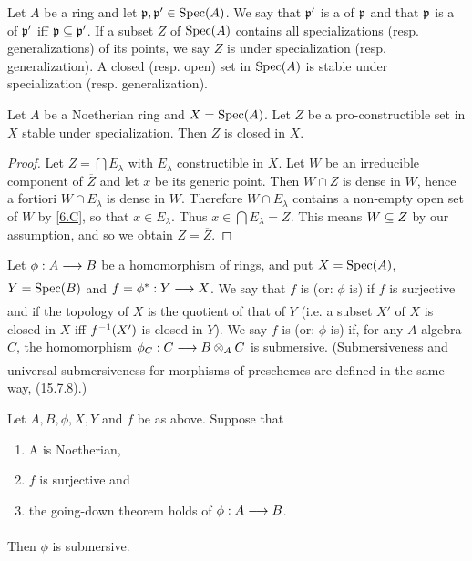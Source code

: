 \documentclass[../main]{subfiles}
\begin{document}
\newparagraph Let $A$ be a ring and let $\mathfrak{p}, \mathfrak{p}' \in \operatorname{Spec}(A)$. We say that $\mathfrak{p}'$ is a  of $\mathfrak{p}$ and that $\mathfrak{p}$ is a  of $\mathfrak{p}'$ iff $\mathfrak{p} \subseteq \mathfrak{p}'$. If a subset $Z$ of $\operatorname{Spec}(A)$ contains all specializations (resp. generalizations) of its points, we say $Z$ is  under specialization (resp. generalization). A closed (resp. open) set in $\operatorname{Spec}(A)$ is stable under specialization (resp. generalization). 

\begin{lemma} \label{lem:06.04}
Let $A$ be a Noetherian ring and $X = \operatorname{Spec}(A)$. Let $Z$ be a pro-constructible set in $X$ stable under specialization. Then $Z$ is closed in $X$.
\end{lemma}

\begin{proof}
Let $Z = \bigcap E_\lambda$ with $E_\lambda$ constructible in $X$. Let $W$ be an irreducible component of $\overline{Z}$ and let $x$ be its generic point. Then $W \cap Z$ is dense in $W$, hence a fortiori $W \cap E_\lambda$ is dense in $W$. Therefore $W \cap E_\lambda$ contains a non-empty open set of $W$ by \ref{6.C}, so that $x \in E_\lambda$. Thus $ x \in \bigcap E_\lambda = Z$. This means $W \subseteq Z$ by our assumption, and so we obtain $Z = \overline{Z}$.
\end{proof}

\newparagraph Let $\phi: A \varrightarrow{} B$ be a homomorphism of rings, and put $X = \operatorname{Spec}(A)$, $Y= \operatorname{Spec}(B)$ and $f = \SpecInduced{\phi}: Y \varrightarrow{} X$. We say that $f$ is (or: $\phi$ is)  if $f$ is surjective and if the topology of $X$ is the quotient of that of $Y$ (i.e. a subset $X'$ of $X$ is closed in $X$ iff $f^{-1}(X')$ is closed in $Y$). We say $f$ is (or: $\phi$ is)  if, for any $A$-algebra $C$, the homomorphism $\phi_C : C \varrightarrow{} B \otimes_A C$ is submersive. (Submersiveness and universal submersiveness for morphisms of preschemes are defined in the same way, \cite{egaIV3} (15.7.8).)

\begin{theorem} \label{thm:007}
Let $A, B, \phi, X, Y$ and $f$ be as above. Suppose that 
\begin{enumerate}[label = (\arabic*)]
    \item A is Noetherian, 
    \item $f$ is surjective and
    \item the going-down theorem holds of $\phi: A \varrightarrow{} B$.
\end{enumerate}
Then $\phi$ is submersive.
\end{theorem}
\end{document}
